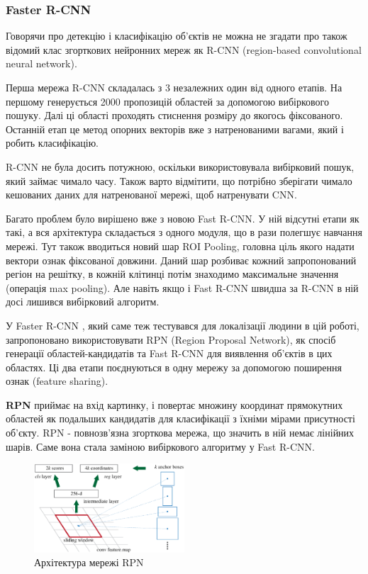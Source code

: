 \subsubsection{Faster R-CNN}

Говорячи про детекцію і класифікацію об'єктів не можна не згадати про також відомий
клас згорткових нейронних мереж як R-CNN (region-based convolutional neural network).

Перша мережа R-CNN складалась з 3 незалежних один від одного етапів.
На першому генерується 2000 пропозицій областей за допомогою
вибіркового пошуку. Далі ці області проходять стиснення розміру до якогось
фіксованого. Останній етап це метод опорних векторів вже з натренованими
вагами, який і робить класифікацію.

R-CNN не була досить потужною, оскільки використовувала вибірковий пошук,
який займає чимало часу. Також варто відмітити, що потрібно зберігати чимало
кешованих даних для натренованої мережі, щоб натренувати CNN.

Багато проблем було вирішено вже з новою Fast R-CNN. У ній відсутні етапи як такі,
а вся архітектура складається з одного модуля, що в рази полегшує
навчання мережі. Тут також вводиться новий шар ROI Pooling, головна ціль якого
надати вектори ознак фіксованої довжини. Даний шар розбиває кожний запропонований
регіон на решітку, в кожній клітинці потім знаходимо максимальне значення
(операція max pooling). Але навіть якщо і  Fast R-CNN швидша за R-CNN в ній досі
лишився вибірковий алгоритм.

У Faster R-CNN \cite{faster_rcnn}, який саме теж тестувався для локалізації людини в
цій роботі, запропоновано використовувати RPN (Region Proposal Network), як спосіб
генерації областей-кандидатів та Fast R-CNN для виявлення об'єктів в цих областях.
Ці два етапи поєднуються в одну мережу за допомогою поширення ознак (feature sharing).


\textbf{RPN}  приймає на вхід картинку, і повертає множину координат прямокутних областей як подальших
кандидатів для класифікації з їхніми мірами присутності об'єкту. RPN - повнозв'язна
згорткова мережа, що значить в ній немає лінійних шарів. Саме вона стала заміною
вибіркового алгоритму у Fast R-CNN.

\begin{figure}[H]
    \centering
    \includegraphics[width=0.5\textwidth]{images/cnn_faster_rcnn_rpn}
    \caption{Архітектура мережі RPN \cite{faster_rcnn}
        \label{fig:cnn:faster_rcnn_rpn}
    }
\end{figure}

